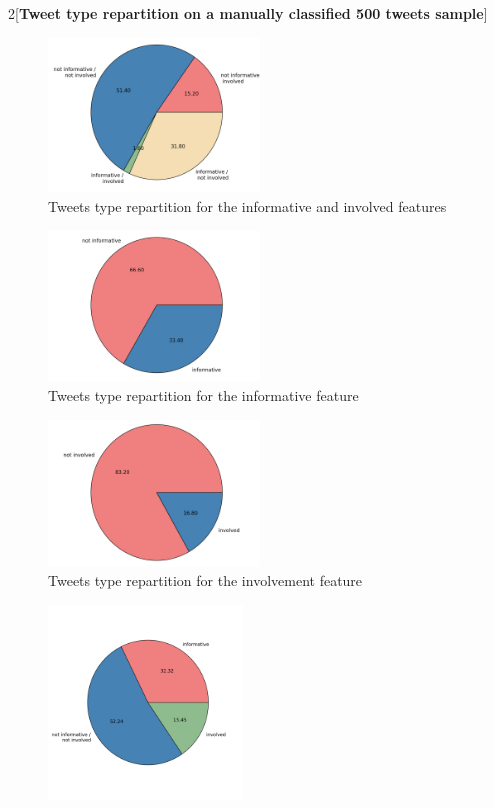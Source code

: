 \documentclass[a4paper,twoside,12pt,openright]{report}
\begin{document}
\begin{multicols}{2}[\textbf{Tweet type repartition on a manually classified 500 tweets sample}]

\begin{figure}[H]
\centering
\includegraphics[width=0.5\textwidth]{images/plots/pies/pie_pairs.png}
\caption{Tweets type repartition for the informative and involved features}
\label{pieTypeInfInv}
\end{figure}
\begin{figure}[H]
\centering
\includegraphics[width=0.5\textwidth]{images/plots/pies/pie_info.png}
\caption{Tweets type repartition for the informative feature}
\label{pieTypeInf}
\end{figure}
\begin{figure}[H]
\centering
\includegraphics[width=0.5\textwidth]{images/plots/pies/pie_invo.png}
\caption{Tweets type repartition for the involvement feature}
\label{pieTypeInv}
\end{figure}
\vspace*{-0.6cm}
\begin{figure}[H]
\centering
\includegraphics[width=0.46\textwidth]{images/plots/pies/pie_pairs3.png}

\end{figure}
\end{multicols}
\end{document}
